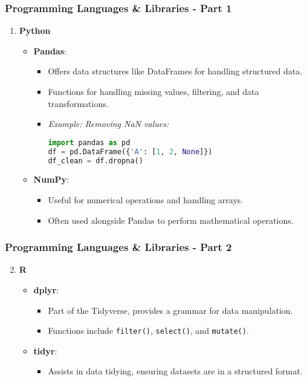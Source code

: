 \documentclass{beamer}
\begin{document}
\begin{frame}
    \frametitle{Programming Languages \& Libraries - Part 1}
    \begin{enumerate}
        \item \textbf{Python}
            \begin{itemize}
                \item \textbf{Pandas}:
                \begin{itemize}
                    \item Offers data structures like DataFrames for handling structured data.
                    \item Functions for handling missing values, filtering, and data transformations.
                    \item \textit{Example: Removing NaN values:}
                    \begin{lstlisting}[language=Python]
import pandas as pd
df = pd.DataFrame({'A': [1, 2, None]})
df_clean = df.dropna()
                    \end{lstlisting}
                \end{itemize}
                \item \textbf{NumPy}:
                \begin{itemize}
                    \item Useful for numerical operations and handling arrays.
                    \item Often used alongside Pandas to perform mathematical operations.
                \end{itemize}
            \end{itemize}
    \end{enumerate}
\end{frame}

\begin{frame}
    \frametitle{Programming Languages \& Libraries - Part 2}
    \begin{enumerate}
        \setcounter{enumi}{1}
        \item \textbf{R}
            \begin{itemize}
                \item \textbf{dplyr}:
                \begin{itemize}
                    \item Part of the Tidyverse, provides a grammar for data manipulation.
                    \item Functions include \texttt{filter()}, \texttt{select()}, and \texttt{mutate()}.
                \end{itemize}
                \item \textbf{tidyr}:
                \begin{itemize}
                    \item Assists in data tidying, ensuring datasets are in a structured format.
                \end{itemize}
            \end{itemize}
    \end{enumerate}
\end{frame}
\end{document}
